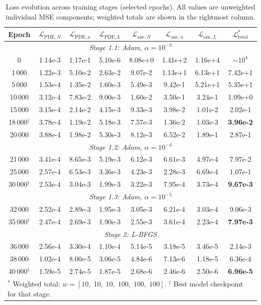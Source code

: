 \documentclass[14pt,a4paper,openany]{extbook}
\renewcommand{\footnotesize}{\fontsize{12}{14}\selectfont}
\begin{document}
\begin{table}[htb]
\centering
\caption{Loss evolution across training stages (selected epochs).  All
values are unweighted individual MSE components; weighted totals are shown
in the rightmost column.}
\label{tab:qs_loss_evolution}
\small
\begin{tabular}{cccccccc}
\hline
\textbf{Epoch}
  & $\mathcal{L}_{\mathrm{PDE},N}$
  & $\mathcal{L}_{\mathrm{PDE},u}$
  & $\mathcal{L}_{\mathrm{PDE},L}$
  & $\mathcal{L}_{\mathrm{anc},N}$
  & $\mathcal{L}_{\mathrm{anc},u}$
  & $\mathcal{L}_{\mathrm{anc},L}$
  & $\mathcal{L}_{\mathrm{total}}^{*}$ \\ \hline
%
\multicolumn{8}{c}{\textit{Stage 1.1: Adam, $\alpha=10^{-3}$}} \\ \hline
0       & 1.14e-3 & 1.17e-1 & 5.10e-6 & 8.08e+0 & 1.41e+2 & 1.16e+4 & $\sim 10^{4}$ \\
1\,000  & 1.22e-3 & 5.10e-2 & 2.63e-2 & 9.07e-2 & 1.13e+1 & 6.13e+1 & 7.42e+1 \\
5\,000  & 1.53e-4 & 1.35e-2 & 1.60e-3 & 5.49e-3 & 9.42e-1 & 5.21e+1 & 5.35e+1 \\
10\,000 & 3.12e-4 & 7.83e-2 & 9.00e-3 & 1.60e-2 & 3.50e-1 & 3.24e-1 & 1.09e+0 \\
15\,000 & 3.15e-4 & 2.14e-2 & 4.15e-3 & 9.33e-3 & 3.98e-2 & 1.01e-2 & 2.02e-1 \\
18\,000$^\dag$ & 3.78e-4 & 1.19e-2 & 5.18e-3 & 7.57e-3 & 1.36e-2 & 1.03e-3 & \textbf{3.96e-2} \\
20\,000 & 3.88e-4 & 1.98e-2 & 5.30e-3 & 8.12e-3 & 6.52e-2 & 1.89e-1 & 2.87e-1 \\ \hline
%
\multicolumn{8}{c}{\textit{Stage 1.2: Adam, $\alpha=10^{-4}$}} \\ \hline
21\,000 & 3.41e-4 & 8.65e-3 & 5.19e-3 & 6.12e-3 & 6.61e-3 & 4.97e-4 & 7.97e-2 \\
25\,000 & 2.57e-4 & 6.53e-3 & 3.36e-3 & 4.23e-3 & 2.28e-3 & 6.69e-4 & 1.07e-1 \\
30\,000$^\dag$ & 2.53e-4 & 3.04e-3 & 1.99e-3 & 3.22e-3 & 7.95e-4 & 3.73e-4 & \textbf{9.67e-3} \\ \hline
%
\multicolumn{8}{c}{\textit{Stage 1.3: Adam, $\alpha=10^{-5}$}} \\ \hline
32\,000 & 2.52e-4 & 2.89e-3 & 1.95e-3 & 3.05e-3 & 6.21e-4 & 3.03e-4 & 9.06e-3 \\
35\,000$^\dag$ & 2.47e-4 & 2.69e-3 & 1.90e-3 & 2.55e-3 & 3.61e-4 & 2.23e-4 & \textbf{7.97e-3} \\ \hline
%
\multicolumn{8}{c}{\textit{Stage 2: L-BFGS}} \\ \hline
36\,000 & 2.56e-4 & 3.30e-4 & 1.10e-4 & 5.14e-5 & 3.18e-5 & 3.46e-5 & 2.14e-3 \\
38\,000 & 1.02e-4 & 8.00e-5 & 3.06e-5 & 4.84e-6 & 7.13e-6 & 1.18e-5 & 6.36e-4 \\
40\,000$^\dag$ & 1.59e-5 & 2.74e-5 & 1.87e-5 & 2.68e-6 & 2.46e-6 & 2.50e-6 & \textbf{6.96e-5} \\ \hline
\multicolumn{8}{l}{\footnotesize ${}^{*}$ Weighted total:
$w = [10,\; 10,\; 10,\; 100,\; 100,\; 100]$. \quad
${}^{\dag}$ Best model checkpoint for that stage.}
\end{tabular}
\end{table}
\end{document}
